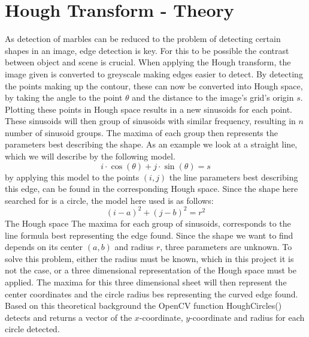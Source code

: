 \documentclass[../../../../main.tex]{subfile}
\begin{document}
\section{Hough Transform - Theory}

As detection of marbles can be reduced to the problem of detecting certain shapes in an image, edge detection is key. For this to be possible the contrast between object and scene is crucial. 
When applying the Hough transform, the image given is converted to greyscale making edges easier to detect. 
By detecting the points making up the contour, these can now be converted into Hough space, by taking the angle to the point $\theta$
and the distance to the image's grid's origin $s$.\\
Plotting these points in Hough space results in a new sinusoids for each point. These sinusoids will then group of sinusoids with similar frequency, 
resulting in $n$ number of sinusoid groups. The maxima of each group then represents the parameters best describing the shape. As an example we look at a straight line, which we will describe by the following model.
$$i\cdot \cos(\theta) + j\cdot \sin(\theta) = s$$
by applying this model to the points $(i,j)$ the line parameters best describing this edge, can be found in the corresponding Hough space. Since the shape here searched for is a circle, the model here used is as follows:
$$ (i-a)^2 + (j-b)^2 = r^2 $$
The Hough space
The maxima for each group of sinusoids, corresponds to the line formula best representing the edge found. Since the shape we want to find depends on its center $(a,b)$ and radius $r$, three parameters are unknown. To solve this problem, either the radius must be known, which in this project it is not the case, or a three dimensional representation of the Hough space must be applied. The maxima for this three dimensional sheet will then represent the center coordinates and the circle radius bes representing the curved edge found. Based on this theoretical background the OpenCV function HoughCircles() detects and returns a vector of the $x$-coordinate, $y$-coordinate and radius for each circle detected.   
\end{document}
